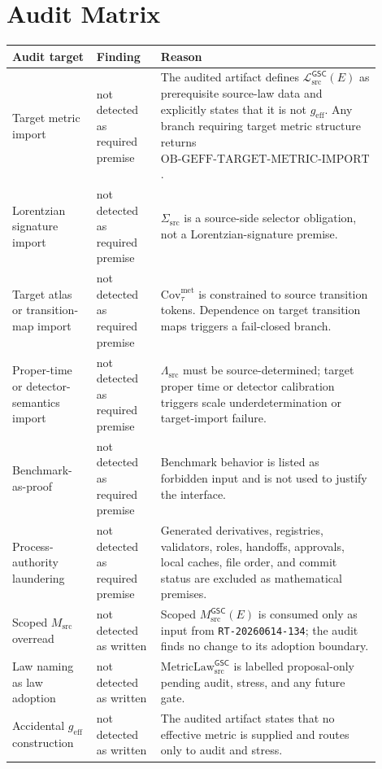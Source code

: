 \documentclass[11pt]{article}
\newcommand{\Msrc}{M_{\mathrm{src}}}
\newcommand{\MsrcGSC}{M_{\mathrm{src}}^{\mathsf{GSC}}}
\newcommand{\MetricLaw}{\mathrm{MetricLaw}_{\mathrm{src}}^{\mathsf{GSC}}}
\newcommand{\MetricData}{\mathcal{L}_{\mathrm{src}}^{\mathsf{GSC}}}
\newcommand{\geff}{g_{\mathrm{eff}}}
\begin{document}
\section{Audit Matrix}

\begin{longtable}{p{0.30\linewidth}p{0.23\linewidth}p{0.37\linewidth}}
\toprule
Audit target & Finding & Reason \\
\midrule
Target metric import & not detected as required premise & The audited artifact
defines \(\MetricData(E)\) as prerequisite source-law data and explicitly
states that it is not \(\geff\). Any branch requiring target metric structure
returns \(\mathrm{OB\mbox{-}GEFF\mbox{-}TARGET\mbox{-}METRIC\mbox{-}IMPORT}\). \\
Lorentzian signature import & not detected as required premise &
\(\Sigma_{\mathrm{src}}\) is a source-side selector obligation, not a
Lorentzian-signature premise. \\
Target atlas or transition-map import & not detected as required premise &
\(\mathrm{Cov}_{\tau}^{\mathrm{met}}\) is constrained to source transition
tokens. Dependence on target transition maps triggers a fail-closed branch. \\
Proper-time or detector-semantics import & not detected as required premise &
\(\Lambda_{\mathrm{src}}\) must be source-determined; target proper time or
detector calibration triggers scale underdetermination or target-import
failure. \\
Benchmark-as-proof & not detected as required premise & Benchmark behavior is
listed as forbidden input and is not used to justify the interface. \\
Process-authority laundering & not detected as required premise & Generated
derivatives, registries, validators, roles, handoffs, approvals, local caches,
file order, and commit status are excluded as mathematical premises. \\
Scoped \(\Msrc\) overread & not detected as written & Scoped \(\MsrcGSC(E)\)
is consumed only as input from \texttt{RT-20260614-134}; the audit finds no
change to its adoption boundary. \\
Law naming as law adoption & not detected as written & \(\MetricLaw\) is
labelled proposal-only pending audit, stress, and any future gate. \\
Accidental \(\geff\) construction & not detected as written & The audited
artifact states that no effective metric is supplied and routes only to audit
and stress. \\
\bottomrule
\end{longtable}
\end{document}
